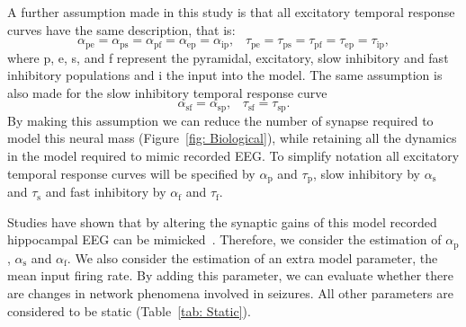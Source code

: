 A further assumption made in this study is that all excitatory temporal response curves have the same description, that is:
\begin{equation}\label{eq:ExcSynapse}
    \alpha_{\mathrm{pe}} = \alpha_{\mathrm{ps}} = \alpha_{\mathrm{pf}} = \alpha_{\mathrm{ep}} = \alpha_{\mathrm{ip}},\,\,\,\,\, \tau_{\mathrm{pe}} = \tau_{\mathrm{ps}} = \tau_{\mathrm{pf}} = \tau_{\mathrm{ep}} = \tau_{\mathrm{ip}},
\end{equation} where p, e, s, and f represent the pyramidal, excitatory, slow inhibitory and fast inhibitory populations and i the input into the model. The same assumption is also made for the slow inhibitory temporal response curve
		\begin{equation}\label{eq:InhSynapse}
		\alpha_{\mathrm{sf}} = \alpha_{\mathrm{sp}},\,\,\,\,\, \tau_{\mathrm{sf}} = \tau_{\mathrm{sp}}.
\end{equation}  By making this assumption we can reduce the number of synapse required to model this neural mass (Figure~\ref{fig: Biological}), while retaining all the dynamics in the model required to mimic recorded EEG. To simplify notation all excitatory temporal response curves will be specified by $\alpha_{\mathrm{p}}$ and $\tau_{\mathrm{p}}$, slow inhibitory by $\alpha_{\mathrm{s}}$ and $\tau_{\mathrm{s}}$ and fast inhibitory by $\alpha_{\mathrm{f}}$ and $\tau_{\mathrm{f}}$. 

Studies have shown that by altering the synaptic gains of this model recorded hippocampal EEG can be mimicked~\citep{wendling2002epileptic}. Therefore, we consider the estimation of $\alpha_{\mathrm{p}}$, $\alpha_{\mathrm{s}}$ and $\alpha_{\mathrm{f}}$. We also consider the estimation of an extra model parameter, the mean input firing rate. By adding this parameter, we can evaluate whether there are changes in network phenomena involved in seizures. All other parameters are considered to be static (Table~\ref{tab: Static}).

